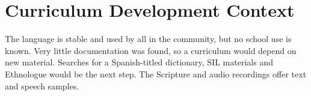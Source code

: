 \documentclass[12pt]{article}
\begin{document}
\section{Curriculum Development Context}
The language is stable and used by all in the community, but no school use is known. Very little documentation was found, so a curriculum would depend on new material. Searches for a Spanish-titled dictionary, SIL materials and Ethnologue would be the next step. The Scripture and audio recordings offer text and speech samples.
\end{document}
